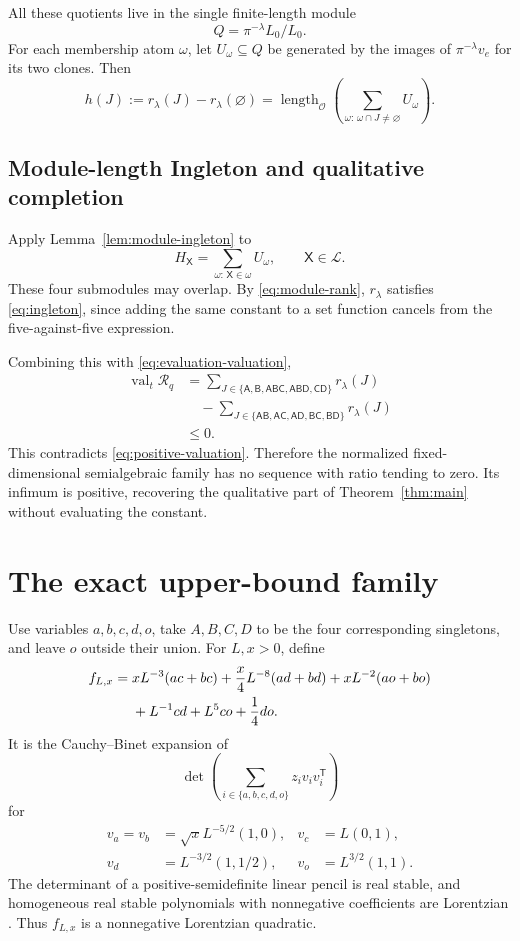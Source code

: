 \documentclass[11pt]{article}
\theoremstyle{remark}
\newcommand{\OO}{\mathcal{O}}
\newcommand{\length}{\operatorname{length}}
\newcommand{\val}{\operatorname{val}}
\begin{document}
All these quotients live in the single finite-length module
\[
 Q=\pi^{-\lambda}L_0/L_0.
\]
For each membership atom $\omega$, let $U_\omega\subseteq Q$ be generated by
the images of $\pi^{-\lambda}v_e$ for its two clones.  Then
\begin{equation}
 h(J):=r_\lambda(J)-r_\lambda(\varnothing)
 =\length_\OO\left(
   \sum_{\omega:\,\omega\cap J\neq\varnothing}U_\omega
  \right).
 \label{eq:module-rank}
\end{equation}

\subsection{Module-length Ingleton and qualitative completion}

Apply Lemma~\ref{lem:module-ingleton} to
\[
 H_{\mathsf X}=\sum_{\omega:\,\mathsf X\in\omega}U_\omega,
 \qquad \mathsf X\in\mathcal L.
\]
These four submodules may overlap.  By \eqref{eq:module-rank},
$r_\lambda$ satisfies \eqref{eq:ingleton}, since adding the same constant to a
set function cancels from the five-against-five expression.

Combining this with \eqref{eq:evaluation-valuation},
\begin{align*}
 \val_t\mathcal R_q
 &=\sum_{J\in\{\mathsf A,\mathsf B,\mathsf{ABC},\mathsf{ABD},\mathsf{CD}\}}
     r_\lambda(J)\\
 &\quad-\sum_{J\in\{\mathsf{AB},\mathsf{AC},\mathsf{AD},
                       \mathsf{BC},\mathsf{BD}\}}r_\lambda(J)\\
 &\leq0.
\end{align*}
This contradicts \eqref{eq:positive-valuation}.  Therefore the normalized
fixed-dimensional semialgebraic family has no sequence with ratio tending to
zero.  Its infimum is positive, recovering the qualitative part of
Theorem~\ref{thm:main} without evaluating the constant.

\section{The exact upper-bound family}

Use variables $a,b,c,d,o$, take $A,B,C,D$ to be the four corresponding
singletons, and leave $o$ outside their union.  For $L,x>0$, define
\begin{align}
 f_{L,x}={}&xL^{-3}(ac+bc)+\frac{x}{4}L^{-8}(ad+bd)
 +xL^{-2}(ao+bo)\notag\\
 &+L^{-1}cd+L^5co+\frac14do.
 \label{eq:upper-family}
\end{align}
It is the Cauchy--Binet expansion of
\[
 \det\left(\sum_{i\in\{a,b,c,d,o\}}z_i v_iv_i^{\mathsf T}\right)
\]
for
\begin{align*}
 v_a=v_b&=\sqrt{x}L^{-5/2}(1,0),&
 v_c&=L(0,1),\\
 v_d&=L^{-3/2}(1,1/2),&
 v_o&=L^{3/2}(1,1).
\end{align*}
The determinant of a positive-semidefinite linear pencil is real stable, and
homogeneous real stable polynomials with nonnegative coefficients are
Lorentzian \cite{BrandenHuh2020}.  Thus $f_{L,x}$ is a nonnegative
Lorentzian quadratic.
\end{document}
